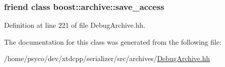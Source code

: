 \subsubsection[{\texorpdfstring{boost\+::archive\+::save\+\_\+access}{boost::archive::save_access}}]{\setlength{\rightskip}{0pt plus 5cm}friend class boost\+::archive\+::save\+\_\+access\hspace{0.3cm}{\ttfamily [friend]}}\hypertarget{classxtd_1_1serializer_1_1DebugBinOArchive_aaca003bb8a4fc59424e4025130da4edd}{}\label{classxtd_1_1serializer_1_1DebugBinOArchive_aaca003bb8a4fc59424e4025130da4edd}


Definition at line 221 of file Debug\+Archive.\+hh.



The documentation for this class was generated from the following file\+:\begin{DoxyCompactItemize}
\item 
/home/psyco/dev/xtdcpp/serializer/src/archives/\hyperlink{DebugArchive_8hh}{Debug\+Archive.\+hh}\end{DoxyCompactItemize}
